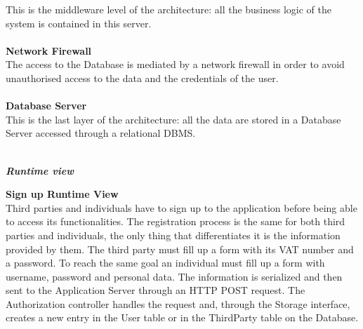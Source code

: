 \begin{legal}
This is the middleware level of the architecture: all the business logic of
the system is contained in this server.\\\\
		\textbf{Network Firewall}\\
The access to the Database is mediated by a network firewall in order to
avoid unauthorised access to the data and the credentials of the user.\\\\
		\textbf{Database Server}\\
This is the last layer of the architecture: all the data are stored in a Database Server accessed through a relational DBMS. \\\\
		\item \textit{\textbf{Runtime view}}\\
			\begin{legal}
				\item \textbf{Sign up Runtime View}\\
Third parties and individuals have to sign up to the application before being able to access its functionalities.
The registration process is the same for both third parties and individuals, the only thing that differentiates it  is the information provided by them.
The third party must fill up a form with its VAT number and a password. To reach the same goal an individual must fill up a form with username, password and personal data.
The information is serialized and then sent to the Application Server through an HTTP POST request.
The Authorization controller handles the request and, through the Storage interface, creates a new
entry in the User table or in the ThirdParty table on the Database. \\
				\begin{figure}[H]

\end{figure}
\end{legal}
\end{legal}

